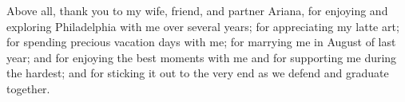 Above all, thank you to my wife, friend, and partner Ariana, for enjoying and exploring Philadelphia with me over several years; for appreciating my latte art; for spending precious vacation days with me; for marrying me in August of last year; and for enjoying the best moments with me and for supporting me during the hardest; and for sticking it out to the very end as we defend and graduate together.

%
%
%
%
%
%
